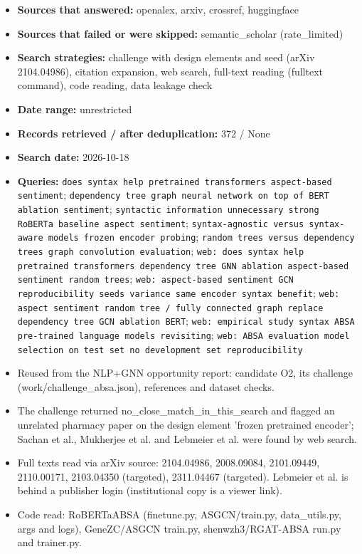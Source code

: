 \documentclass[11pt,a4paper]{article}
\begin{document}
\begin{itemize}
\item \textbf{Sources that answered:} openalex, arxiv, crossref, huggingface
\item \textbf{Sources that failed or were skipped:} semantic\_scholar (rate\_limited)
\item \textbf{Search strategies:} challenge with design elements and seed (arXiv 2104.04986), citation expansion, web search, full-text reading (fulltext command), code reading, data leakage check
\item \textbf{Date range:} unrestricted
\item \textbf{Records retrieved / after deduplication:} 372 / None
\item \textbf{Search date:} 2026-10-18
\item \textbf{Queries:} \texttt{does syntax help pretrained transformers aspect-based sentiment}; \texttt{dependency tree graph neural network on top of BERT ablation sentiment}; \texttt{syntactic information unnecessary strong RoBERTa baseline aspect sentiment}; \texttt{syntax-agnostic versus syntax-aware models frozen encoder probing}; \texttt{random trees versus dependency trees graph convolution evaluation}; \texttt{web: does syntax help pretrained transformers dependency tree GNN ablation aspect-based sentiment random trees}; \texttt{web: aspect-based sentiment GCN reproducibility seeds variance same encoder syntax benefit}; \texttt{web: aspect sentiment random tree / fully connected graph replace dependency tree GCN ablation BERT}; \texttt{web: empirical study syntax ABSA pre-trained language models revisiting}; \texttt{web: ABSA evaluation model selection on test set no development set reproducibility}
\item Reused from the NLP+GNN opportunity report: candidate O2, its challenge (work/challenge\_absa.json), references and dataset checks.
\item The challenge returned no\_close\_match\_in\_this\_search and flagged an unrelated pharmacy paper on the design element 'frozen pretrained encoder'; Sachan et al., Mukherjee et al. and Lebmeier et al. were found by web search.
\item Full texts read via arXiv source: 2104.04986, 2008.09084, 2101.09449, 2110.00171, 2103.04350 (targeted), 2311.04467 (targeted). Lebmeier et al. is behind a publisher login (institutional copy is a viewer link).
\item Code read: RoBERTaABSA (finetune.py, ASGCN/train.py, data\_utils.py, args and logs), GeneZC/ASGCN train.py, shenwzh3/RGAT-ABSA run.py and trainer.py.
\end{itemize}
\end{document}
